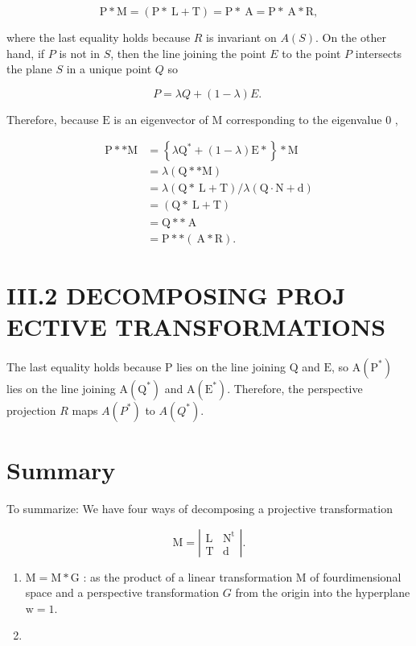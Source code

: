 $$
\mathrm{P} * \mathrm{M}=(\mathrm{P} * \mathrm{~L}+\mathrm{T})=\mathrm{P} * \mathrm{~A}=\mathrm{P} * \mathrm{~A} * \mathrm{R},
$$

where the last equality holds because $R$ is invariant on $A(S)$. On the other hand, if $P$ is not in $S$, then the line joining the point $E$ to the point $P$ intersects the plane $S$ in a unique point $Q$ so

$$
P=\lambda Q+(1-\lambda) E \text {. }
$$

Therefore, because $\mathrm{E}$ is an eigenvector of $\mathrm{M}$ corresponding to the eigenvalue 0 ,

$$
\begin{aligned}
\mathrm{P} * * \mathrm{M} &=\left\{\lambda \mathrm{Q}^{*}+(1-\lambda) \mathrm{E} *\right\} * \mathrm{M} \\
&=\lambda(\mathrm{Q} * * \mathrm{M}) \\
&=\lambda(\mathrm{Q} * \mathrm{~L}+\mathrm{T}) / \lambda(\mathrm{Q} \cdot \mathrm{N}+\mathrm{d}) \\
&=(\mathrm{Q} * \mathrm{~L}+\mathrm{T}) \\
&=\mathrm{Q} * * \mathrm{~A} \\
&=\mathrm{P} * *(\mathrm{~A} * \mathrm{R}) .
\end{aligned}
$$

\section{III.2 DECOMPOSING PROJ ECTIVE TRANSFORMATIONS}
The last equality holds because $\mathrm{P}$ lies on the line joining $\mathrm{Q}$ and $\mathrm{E}$, so $\mathrm{A}\left(\mathrm{P}^{*}\right)$ lies on the line joining $\mathrm{A}\left(\mathrm{Q}^{*}\right)$ and $\mathrm{A}\left(\mathrm{E}^{*}\right)$. Therefore, the perspective projection $R$ maps $A\left(P^{*}\right)$ to $A\left(Q^{*}\right)$.

\section{Summary}
To summarize: We have four ways of decomposing a projective transformation

$$
\mathrm{M}=\left|\begin{array}{cc}
\mathrm{L} & \mathrm{N}^{\mathrm{t}} \\
\mathrm{T} & \mathrm{d}
\end{array}\right| .
$$

\begin{enumerate}
  \item $\mathrm{M}=\mathrm{M} * \mathrm{G}$ : as the product of a linear transformation $\mathrm{M}$ of fourdimensional space and a perspective transformation $G$ from the origin into the hyperplane $\mathrm{w}=1$.

  \item 
\end{enumerate}

